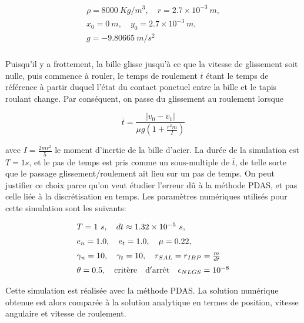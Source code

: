 \begin{eqnarray*}
	\begin{array}{l}
	    \rho=8000\ Kg/m^3, \quad r = 2.7\times10^{-3}\ m,\nonumber\\[2mm]
		x_0 = 0\ m, \quad y_0 = 2.7\times10^{-3}\ m,\nonumber\\[2mm]
		g = -9.80665\ m/s^2 \nonumber\\[2mm]
	\end{array}
\end{eqnarray*}

\noindent Puisqu'il y a frottement, la bille glisse jusqu'à ce que la vitesse de glissement soit nulle, puis commence à rouler, le temps de roulement $\overline{t}$ étant le temps de référence à partir duquel l'état du contact ponctuel entre la bille et le tapis roulant change. Par conséquent, on passe du glissement au roulement lorsque

\begin{equation}\label{globalmapapp2}
\overline{t} = \frac{|v_0 - v_1|}{\mu g (1 + \frac{r^2 m}{I})}
\end{equation}

\noindent avec $I = \frac{2 m r^2}{5}$ le moment d'inertie de la bille d'acier. La durée de la simulation est $ T = 1s $, et le pas de temps est pris comme un sous-multiple de $\overline {t} $, de telle sorte que le passage glissement/roulement ait lieu sur un pas de temps. On peut justifier ce choix parce qu'on veut étudier l'erreur dû à la méthode PDAS, et pas celle liée à la discrétisation en temps. Les paramètres numériques utilisés pour cette simulation sont les suivants:

\begin{eqnarray*}
	\begin{array}{l}
	    T = 1\ s,\quad dt \approx 1.32\times10^{-5}\ s, \nonumber \\[2mm]
		e_n = 1.0,\quad e_t = 1.0,\quad \mu = 0.22, \nonumber \\[2mm]
		\gamma_n = 10,\quad \gamma_t = 10, \quad r_{SAL} = r_{IBP} =  \frac{m}{dt} \nonumber  \\[2mm]
		\theta = 0.5,\quad {\rm crit\grave{e}re \quad d'arr\hat{e}t} \quad \epsilon_{NLGS} = 10^{-8}
	\end{array}
\end{eqnarray*}

Cette simulation est réalisée avec la méthode PDAS. La solution numérique obtenue est alors comparée à la solution analytique en termes de position, vitesse angulaire et vitesse de roulement.\\ 

